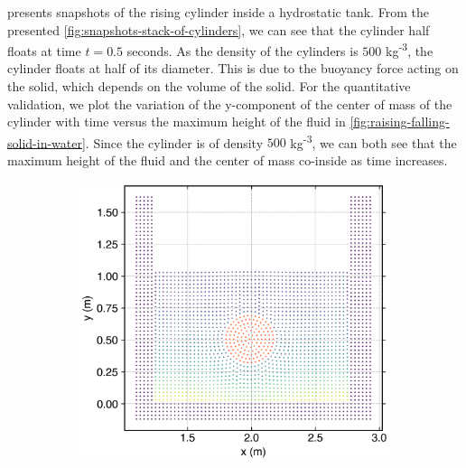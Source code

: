  presents snapshots of the rising
cylinder inside a hydrostatic tank. From the presented
\cref{fig:snapshots-stack-of-cylinders}, we can see that the cylinder half
floats at time $t = 0.5$ seconds. As the density of the cylinders is $500$
kg\textsuperscript{-3}, the cylinder floats at half of its diameter. This is due
to the buoyancy force acting on the solid, which depends on the volume of the
solid. For the quantitative validation, we plot the variation of the y-component of
the center of mass of the cylinder with time versus the maximum height of the
fluid in \cref{fig:raising-falling-solid-in-water}. Since the cylinder is of
density $500$ kg\textsuperscript{-3}, we can both see that the maximum height of the fluid
and the center of mass co-inside as time increases.
\begin{figure}[!htpb]
  \centering
  \begin{subfigure}{0.48\textwidth}
    \centering
    \includegraphics[width=1.0\textwidth]{figures/rfc/figures/dinesh_2022_body_in_hs_tank_2d/time1}
  \end{subfigure}
  \begin{subfigure}{0.48\textwidth}
    \centering

\end{subfigure}
\end{figure}
